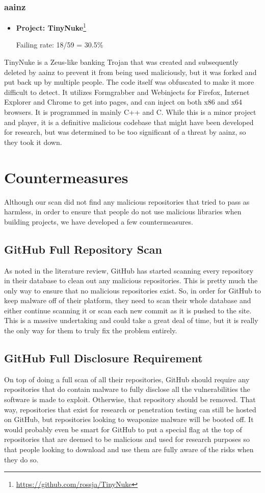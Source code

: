 \documentclass[]{acmart}
\begin{document}
\subsubsection{aainz}
\begin{itemize}
    \item { \bf Project: TinyNuke}\footnote{\url{https://github.com/rossja/TinyNuke}}

    Failing rate: 18/59 = 30.5\%
\end{itemize}

TinyNuke is a Zeus-like banking Trojan that was created and subsequently deleted by aainz to prevent it from being used maliciously, but it was forked and put back up by multiple people. The code itself was obfuscated to make it more difficult to detect. It utilizes Formgrabber and Webinjects for Firefox, Internet Explorer and Chrome to get into pages, and can inject on both x86 and x64 browsers. It is programmed in mainly C++ and C. While this is a minor project and player, it is a definitive malicious codebase that might have been developed for research, but was determined to be too significant of a threat by aainz, so they took it down.


\section{Countermeasures}
Although our scan did not find any malicious repositories that tried to pass as harmless, in order to ensure that people do not use malicious libraries when building projects, we have developed a few countermeasures.
\subsection{GitHub Full Repository Scan}
As noted in the literature review, GitHub has started scanning every repository in their database to clean out any malicious repositories. This is pretty much the only way to ensure that no malicious repositories exist. So, in order for GitHub to keep malware off of their platform, they need to scan their whole database and either continue scanning it or scan each new commit as it is pushed to the site. This is a massive undertaking and could take a great deal of time, but it is really the only way for them to truly fix the problem entirely.
\subsection{GitHub Full Disclosure Requirement}
On top of doing a full scan of all their repositories, GitHub should require any repositories that do contain malware to fully disclose all the vulnerabilities the software is made to exploit. Otherwise, that repository should be removed. That way, repositories that exist for research or penetration testing can still be hosted on GitHub, but repositories looking to weaponize malware will be booted off. It would probably even be smart for GitHub to put a special flag at the top of repositories that are deemed to be malicious and used for research purposes so that people looking to download and use them are fully aware of the risks when they do so.
\end{document}
